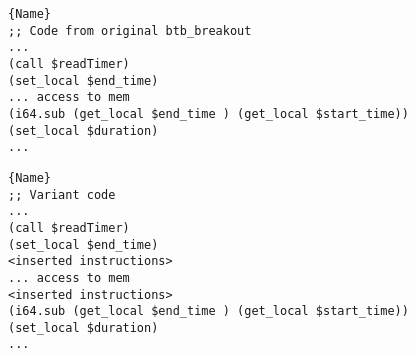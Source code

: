 


   \begin{minipage}[b]{\linewidth}
    \lstset{
        language=WAT,
                        style=watcode,
        basicstyle=\footnotesize\ttfamily,
                        columns=fullflexible,
                        breaklines=true}
        
        \begin{lstlisting}[label=example:timer,caption={Wasm timer used in btb\_breakout program.},frame=b, captionpos=b]{Name}
;; Code from original btb_breakout
...
(call $readTimer)
(set_local $end_time)
... access to mem
(i64.sub (get_local $end_time ) (get_local $start_time))
(set_local $duration)
...

        \end{lstlisting}
\end{minipage}


\begin{minipage}[b]{\linewidth}
    \lstset{
        language=WAT,
                        style=watcode,
        basicstyle=\footnotesize\ttfamily,
                        columns=fullflexible,
                        breaklines=true}
        
        \begin{lstlisting}[label=example:timer2,caption={Variant of btb\_breakout with more instructions added in between time measurement.},frame=b, captionpos=b]{Name}
;; Variant code
...
(call $readTimer)
(set_local $end_time)
<inserted instructions>
... access to mem
<inserted instructions>
(i64.sub (get_local $end_time ) (get_local $start_time))
(set_local $duration)
...
        \end{lstlisting}
\end{minipage}
